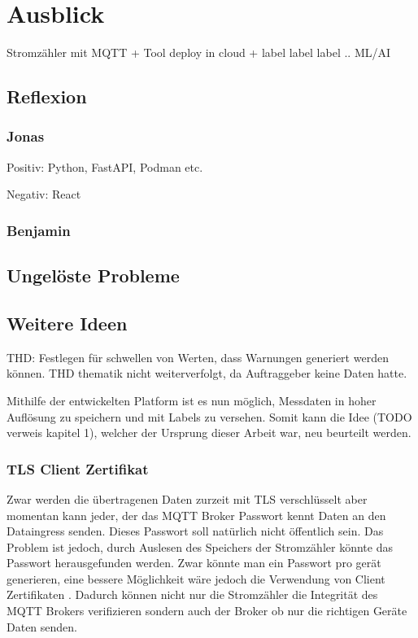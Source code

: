 \chapter{Ausblick}

Stromzähler mit MQTT + Tool deploy in cloud + label label label
..
ML/AI

\section{Reflexion}
\subsection{Jonas}
Positiv: Python, FastAPI, Podman etc.

Negativ:
React

\subsection{Benjamin}
\section{Ungelöste Probleme}



\section{Weitere Ideen}
THD: Festlegen für schwellen von Werten, dass Warnungen generiert werden können.
THD thematik nicht weiterverfolgt, da Auftraggeber keine Daten hatte.

Mithilfe der entwickelten Platform ist es nun möglich, Messdaten in hoher Auflösung zu speichern
und mit Labels zu versehen. Somit kann die Idee (TODO verweis kapitel 1), welcher der Ursprung dieser
Arbeit war, neu beurteilt werden.

\subsection{\ac{TLS} Client Zertifikat}

Zwar werden die übertragenen Daten zurzeit mit \ac{TLS} verschlüsselt aber
momentan kann jeder, der das \ac{MQTT} Broker Passwort kennt Daten an den
Dataingress senden. Dieses Passwort soll natürlich nicht öffentlich sein.
Das Problem ist jedoch, durch Auslesen des Speichers der Stromzähler
könnte das Passwort herausgefunden werden.
Zwar könnte man ein Passwort pro gerät generieren, eine bessere Möglichkeit
wäre jedoch die Verwendung von Client Zertifikaten \parencite{rfc5246_2021}.
Dadurch können nicht nur die Stromzähler die Integrität des \ac{MQTT} Brokers
verifizieren sondern auch der Broker ob nur die richtigen Geräte
Daten senden.


